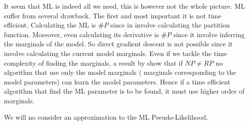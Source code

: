It seem that ML is indeed all we need, this is however not the whole picture.
ML suffer from several drawback.
The first and most important it is not time efficient.
Calculating the ML is $\#P$ since in involve calculating the partition function.
Moreover, even calculating its derivative is $\#P$ since it involve inferring the marginals of the model.
So direct gradient descent is not possible since it involve calculating the current model marginals.
Even if we tackle the time complexity of finding the marginals, a result by \cite{bresler2014hardness,montanari2015computational} show that if $NP \neq RP$ no algorithm that use only the model marginals ( marginals corresponding to the model parameters) can learn the model parameters. 
Hence if a time efficient algorithm that find the ML parameter is to be found, it must use higher order of marginals.

We will no consider an approximation to the ML Pseudo-Likelihood.
